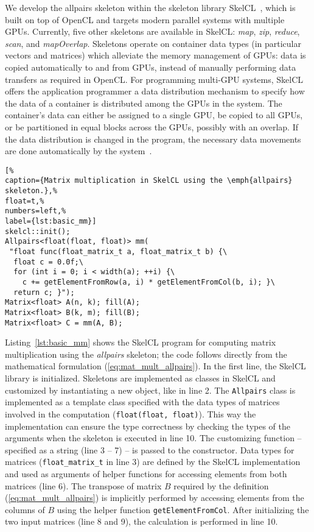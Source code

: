 \vspace{1em}
We develop the allpairs skeleton within the skeleton library SkelCL~\cite{StKG-12}, which is built on top of OpenCL and targets modern parallel systems with multiple GPUs.
Currently, five other skeletons are available in SkelCL: \emph{map}, \emph{zip}, \emph{reduce}, \emph{scan}, and \emph{mapOverlap}.
Skeletons operate on container data types (in particular vectors and matrices) which alleviate the memory management of GPUs:
data is copied automatically to and from GPUs, instead of manually performing data transfers as required in OpenCL.
For programming multi-GPU systems, SkelCL offers the application programmer a data distribution mechanism to specify how the data of a container is distributed among the GPUs in the system.
The container's data can either be assigned to a single GPU, be copied to all GPUs, or be partitioned in equal blocks across the GPUs, possibly with an overlap.
If the data distribution is changed in the program, the necessary data movements are done automatically by the system~\cite{StKG-12}.

\begin{lstlisting}[%                                                             
caption={Matrix multiplication in SkelCL using the \emph{allpairs} skeleton.},%
float=t,%                                                                       
numbers=left,%
label={lst:basic_mm}]
skelcl::init();
Allpairs<float(float, float)> mm(
 "float func(float_matrix_t a, float_matrix_t b) {\
  float c = 0.0f;\
  for (int i = 0; i < width(a); ++i) {\
    c += getElementFromRow(a, i) * getElementFromCol(b, i); }\
  return c; }");
Matrix<float> A(n, k); fill(A);
Matrix<float> B(k, m); fill(B);
Matrix<float> C = mm(A, B);
\end{lstlisting}

Listing~\ref{lst:basic_mm} shows the SkelCL program for computing matrix multiplication using the \emph{allpairs} skeleton;
the code follows directly from the mathematical formulation (\ref{eq:mat_mult_allpairs}).
In the first line, the SkelCL library is initialized.
Skeletons are implemented as classes in SkelCL and customized by instantiating a new object, like in line 2.
The \texttt{Allpairs} class is implemented as a template class specified with the data types of matrices involved in the computation (\texttt{float(float, float)}).
This way the implementation can ensure the type correctness by checking the types of the arguments when the skeleton is executed in line 10.
The customizing function -- specified as a string (line 3 -- 7) -- is passed to the constructor.
Data types for matrices (\texttt{float\_matrix\_t} in line 3) are defined by the SkelCL implementation and used as arguments of helper functions for accessing elements from both matrices (line 6).
The transpose of matrix $B$ required by the definition (\ref{eq:mat_mult_allpairs}) is implicitly performed by accessing elements from the columns of $B$ using the helper function \texttt{getElementFromCol}.
After initializing the two input matrices (line 8 and 9), the calculation is performed in line 10.

